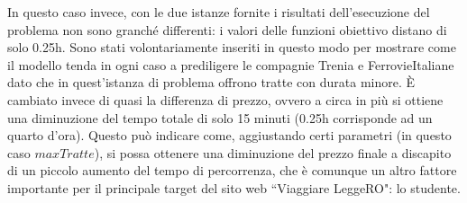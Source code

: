 \documentclass[main.tex]{subfiles}
\begin{document}
In questo caso invece, con le due istanze fornite i risultati dell'esecuzione del problema non sono granché differenti: i valori delle funzioni obiettivo 
distano di solo 0.25h. Sono stati volontariamente inseriti in questo modo per mostrare come il modello tenda in ogni caso a prediligere le compagnie Trenia e 
FerrovieItaliane dato che in quest'istanza di problema offrono tratte con durata minore. È cambiato invece di quasi  la differenza di prezzo, ovvero a 
circa  in più si ottiene una diminuzione del tempo totale di solo 15 minuti (0.25h corrisponde ad un quarto d'ora). Questo può indicare come, aggiustando 
certi parametri (in questo caso $maxTratte$), si possa ottenere una diminuzione del prezzo finale a discapito di un piccolo aumento del tempo di percorrenza, 
che è comunque un altro fattore importante per il principale target del sito web ``Viaggiare LeggeRO": lo studente.
\end{document}
